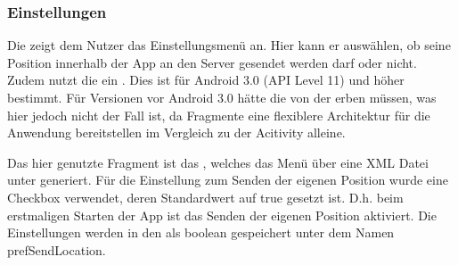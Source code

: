 \subsubsection{Einstellungen}
Die  zeigt dem Nutzer das Einstellungsmenü an. Hier kann er auswählen, ob seine Position innerhalb der App an den Server gesendet werden darf oder nicht. Zudem nutzt die  ein . Dies ist für Android 3.0 (API Level 11) und höher bestimmt. Für Versionen vor Android 3.0 hätte die  von der  erben müssen, was hier jedoch nicht der Fall ist, da Fragmente eine flexiblere Architektur für die Anwendung bereitstellen im Vergleich zu der Acitivity alleine.

Das hier genutzte Fragment ist das , welches das Menü über eine XML Datei  unter  generiert.
Für die Einstellung zum Senden der eigenen Position wurde eine Checkbox verwendet, deren Standardwert auf true gesetzt ist. D.h. beim erstmaligen Starten der App ist das Senden der eigenen Position aktiviert.
Die Einstellungen werden in den  als boolean gespeichert unter dem Namen \glqq prefSendLocation\grqq.